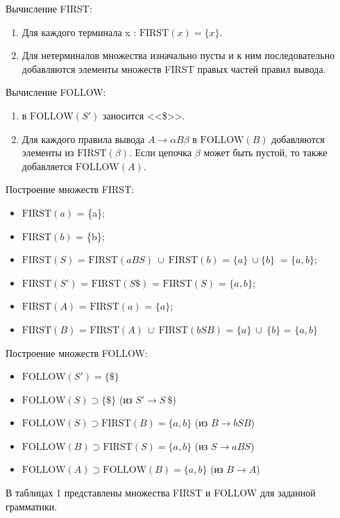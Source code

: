\documentclass[a4paper,final]{article}
\begin{document}
Вычисление FIRST:
\begin{enumerate}
    \item Для каждого терминала x : $\text{FIRST}(x) = \{x\}$.
    \item Для нетерминалов множества изначально пусты и к ним последовательно добавляются элементы множеств FIRST правых частей правил вывода.
\end{enumerate}

Вычисление FOLLOW:
\begin{enumerate}
    \item в $\text{FOLLOW}(S')$ заносится <<\$>>.
    \item Для каждого правила вывода $A \rightarrow \alpha B \beta$ в $\text{FOLLOW}(B)$ добавляются элементы из $\text{FIRST}(\beta)$. Если цепочка $\beta$ может быть пустой, то также добавляется $\text{FOLLOW}(A)$.
\end{enumerate}

Построение множеств FIRST:
\begin{itemize}
    \item $\text{FIRST}(a)$ = \{a\};
    \item $\text{FIRST}(b)$ = \{b\};
    \item $\text{FIRST}(S)$ = $\text{FIRST}(aBS) ~\cup~ \text{FIRST}(b)$ = $\{a\} ~\cup \{b\}~$ = $\{a, b\}$;
    \item $\text{FIRST}(S')$ = $\text{FIRST}(S\$)$ = $\text{FIRST}(S)$ = $\{a, b\}$;
    \item $\text{FIRST}(A)$ = $\text{FIRST}(a)$ = $\{a\}$;
    \item $\text{FIRST}(B)$ = $\text{FIRST}(A) ~\cup~ \text{FIRST}(bSB)$ = $\{a\} ~\cup~ \{b\}$ = $\{a, b\}$
\end{itemize}

Построение множеств FOLLOW:
\begin{itemize}
    \item $\text{FOLLOW}(S') = \{\$\}$
    \item $\text{FOLLOW}(S) \supset \{\$\}$ (из $S' \rightarrow S~\$$)
    \item $\text{FOLLOW}(S) \supset \text{FIRST}(B) = \{a, b\}$ (из $B \rightarrow bSB$)
    \item $\text{FOLLOW}(B) \supset \text{FIRST}(S) = \{a, b\}$ (из $S \rightarrow aBS$)
    \item $\text{FOLLOW}(A) \supset \text{FOLLOW}(B) = \{a, b\}$ (из $B \rightarrow A$)
\end{itemize}

В таблицах 1 представлены множества FIRST и FOLLOW для заданной грамматики.
\end{document}
